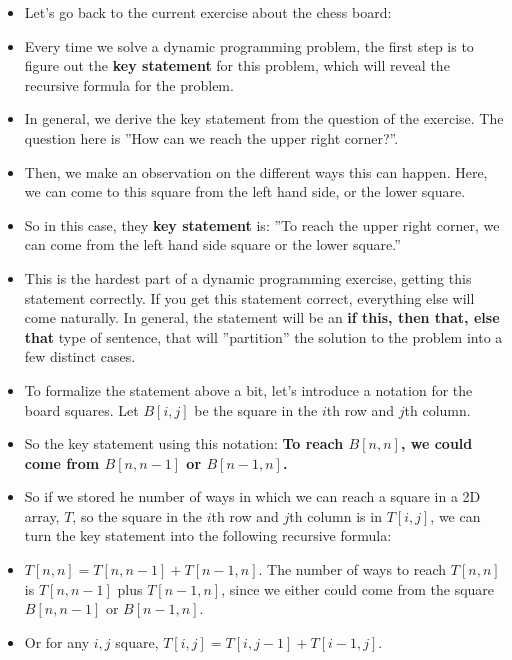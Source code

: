 \begin{itemize}
    \item Let's go back to the current exercise about the chess board:
    \item Every time we solve a dynamic programming problem, the first step is to figure out the \textbf{key statement} for this problem, which will reveal the recursive formula for the problem.
    \item In general, we derive the key statement from the question of the exercise. The question here is ''How can we reach the upper right corner?''.
    \item Then, we make an observation on the different ways this can happen. Here, we can come to this square from the left hand side, or the lower square.
    \item So in this case, they \textbf{key statement} is: ''To reach the upper right corner, we can come from the left hand side square or the lower square.''
    \item This is the hardest part of a dynamic programming exercise, getting this statement correctly. If you get this statement correct, everything else will come naturally. In general, the statement will be an \textbf{if this, then that, else that} type of sentence, that will ''partition'' the solution to the problem into a few distinct cases.
    \item To formalize the statement above a bit, let's introduce a notation for the board squares. Let $B[i,j]$ be the square in the $i$th row and $j$th column.
    \item So the key statement using this notation: \textbf{To reach $B[n,n]$, we could come from $B[n, n-1]$ or $B[n-1, n]$.}
    \item So if we stored he number of ways in which we can reach a square in a 2D array, $T$, so the square in the $i$th row and $j$th column is in $T[i, j]$, we can turn the key statement into the following recursive formula:
    \item $T[n,n] = T[n, n-1] + T[n-1, n]$. The number of ways to reach $T[n,n]$ is $T[n,n-1]$ plus $T[n-1,n]$, since we either could come from the square $B[n, n-1]$ or $B[n-1, n]$.
    \item Or for any $i,j$ square, $T[i,j] = T[i, j-1] + T[i-1, j]$.
\end{itemize}

